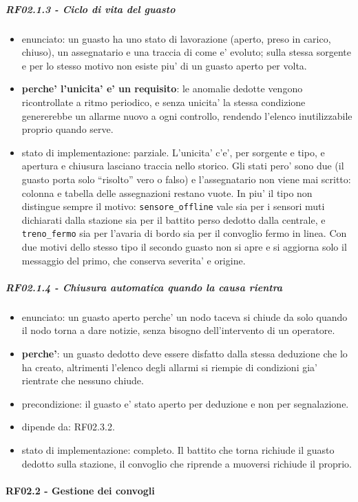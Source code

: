 \documentclass[11pt]{article}
\begin{document}
\subparagraph{RF02.1.3 - Ciclo di vita del guasto}
\label{sec:org48267a9}
\begin{itemize}
\item enunciato: un guasto ha uno stato di lavorazione (aperto, preso in carico, chiuso), un
assegnatario e una traccia di come e' evoluto; sulla stessa sorgente e per lo stesso motivo non
esiste piu' di un guasto aperto per volta.
\item \textbf{perche' l'unicita' e' un requisito}: le anomalie dedotte vengono ricontrollate a ritmo periodico,
e senza unicita' la stessa condizione genererebbe un allarme nuovo a ogni controllo, rendendo
l'elenco inutilizzabile proprio quando serve.
\item stato di implementazione: parziale. L'unicita' c'e', per sorgente e tipo, e apertura e chiusura
lasciano traccia nello storico. Gli stati pero' sono due (il guasto porta solo ``risolto'' vero o
falso) e l'assegnatario non viene mai scritto: colonna e tabella delle assegnazioni restano vuote.
In piu' il tipo non distingue sempre il motivo: \texttt{sensore\_offline} vale sia per i sensori muti
dichiarati dalla stazione sia per il battito perso dedotto dalla centrale, e \texttt{treno\_fermo} sia per
l'avaria di bordo sia per il convoglio fermo in linea. Con due motivi dello stesso tipo il secondo
guasto non si apre e si aggiorna solo il messaggio del primo, che conserva severita' e origine.
\end{itemize}
\subparagraph{RF02.1.4 - Chiusura automatica quando la causa rientra}
\label{sec:org3c35a8c}
\begin{itemize}
\item enunciato: un guasto aperto perche' un nodo taceva si chiude da solo quando il nodo torna a dare
notizie, senza bisogno dell'intervento di un operatore.
\item \textbf{perche'}: un guasto dedotto deve essere disfatto dalla stessa deduzione che lo ha creato,
altrimenti l'elenco degli allarmi si riempie di condizioni gia' rientrate che nessuno chiude.
\item precondizione: il guasto e' stato aperto per deduzione e non per segnalazione.
\item dipende da: RF02.3.2.
\item stato di implementazione: completo. Il battito che torna richiude il guasto dedotto sulla stazione,
il convoglio che riprende a muoversi richiude il proprio.
\end{itemize}
\paragraph{RF02.2 - Gestione dei convogli}
\label{sec:org3b942ca}
\end{document}
